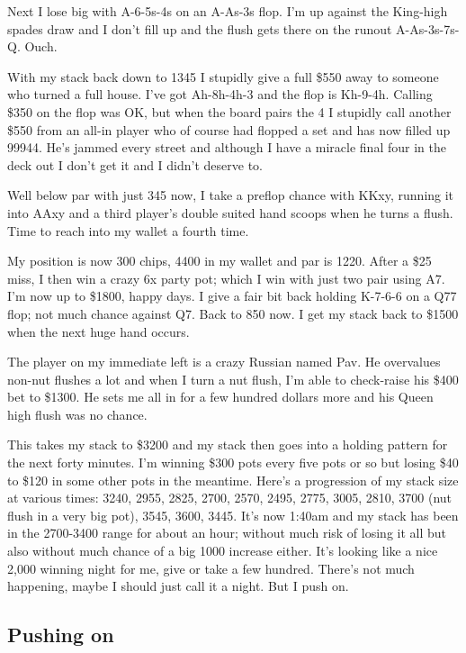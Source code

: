 Next I lose big with A-6-5s-4s on an A-As-3s flop. I'm up against the
King-high spades draw and I don't fill up and the flush gets there on
the runout A-As-3s-7s-Q. Ouch.

With my stack back down to 1345 I stupidly give a full \$550 away to
someone who turned a full house. I've got Ah-8h-4h-3 and the flop is
Kh-9-4h. Calling \$350 on the flop was OK, but when the board pairs
the 4 I stupidly call another \$550 from an all-in player who of
course had flopped a set and has now filled up 99944. He's jammed
every street and although I have a miracle final four in the deck out
I don't get it and I didn't deserve to.

Well below par with just 345 now, I take a preflop chance with KKxy,
running it into AAxy and a third player's double suited hand scoops
when he turns a flush. Time to reach into my wallet a fourth time.

My position is now 300 chips, 4400 in my wallet and par is 1220.
After a \$25 miss, I then win a crazy 6x party pot; which I win with
just two pair using A7. I'm now up to \$1800, happy days. I give
a fair bit back holding K-7-6-6 on a Q77 flop; not much chance against
Q7. Back to 850 now. I get my stack back to \$1500 when the next huge
hand occurs.

The player on my immediate left is a crazy Russian named Pav. He
overvalues non-nut flushes a lot and when I turn a nut flush, I'm able
to check-raise his \$400 bet to \$1300. He sets me all in for a few
hundred dollars more and his Queen high flush was no chance.

This takes my stack to \$3200 and my stack then goes into a holding
pattern for the next forty minutes. I'm winning \$300 pots every five
pots or so but losing \$40 to \$120 in some other pots in the
meantime. Here's a progression of my stack size at various times:
3240, 2955, 2825, 2700, 2570, 2495, 2775, 3005, 2810, 3700 (nut flush
in a very big pot), 3545, 3600, 3445. It's now 1:40am and my stack has
been in the 2700-3400 range for about an hour; without much risk of
losing it all but also without much chance of a big 1000 increase
either. It's looking like a nice 2,000 winning night for me, give or
take a few hundred. There's not much happening, maybe I should just
call it a night. But I push on.

\subsection*{Pushing on}

